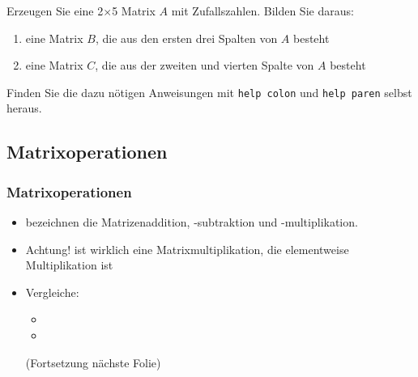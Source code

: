     \secMexercise
    \begin{frame}
        \frameMexercise
        \begin{exercise}
            \sloppy
            Erzeugen Sie eine 2$\times$5 Matrix $A$ mit Zufallszahlen. Bilden Sie daraus:\\
            \begin{enumerate}
                \item eine Matrix $B$, die aus den ersten drei Spalten von $A$ besteht
                \item eine Matrix $C$, die aus der zweiten und vierten Spalte von $A$ besteht
            \end{enumerate}

            \vspace{0.5cm}

            Finden Sie die dazu nötigen Anweisungen mit \texttt{help colon} und \texttt{help paren} selbst heraus.
        \end{exercise}
    \end{frame}

    \subsection{Matrixoperationen}
    \begin{frame}
        \frametitle{Matrixoperationen}
        \begin{itemize}
            \item {} bezeichnen die Matrizenaddition, -subtraktion und -multiplikation.
            \item \alert{Achtung!}  ist wirklich eine Matrixmultiplikation, die elementweise Multiplikation ist 
            \item Vergleiche:
            \begin{itemize}
                \item {}
                \item \matlabInput{[1 2; -2 5] * [3 6; 0 -1]}
            \end{itemize}
            (Fortsetzung nächste Folie)
        \end{itemize}
    \end{frame}

